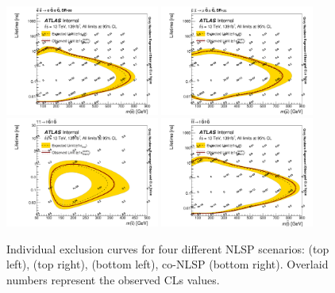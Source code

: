 \begin{figure}[!ht]
    \centering
        \includegraphics[width=0.45\textwidth]{figures/limits/SlepSlep_SRee_clsobs_ps-eps-converted-to.pdf}
        \includegraphics[width=0.45\textwidth]{figures/limits/SlepSlep_SRmm_clsobs_ps-eps-converted-to.pdf}
        \includegraphics[width=0.45\textwidth]{figures/limits/Stau_clsobs_ps-eps-converted-to.pdf}
        \includegraphics[width=0.45\textwidth]{figures/limits/Comb_clsobs_ps-eps-converted-to.pdf}
    \caption{Individual exclusion curves for four different \ac{NLSP} scenarios: \selec (top left), \smu (top right), \stau (bottom left), co-\ac{NLSP} (bottom right). Overlaid numbers represent the observed CLs values.}
    \label{fig:plot_cls}
\end{figure}
\FloatBarrier

